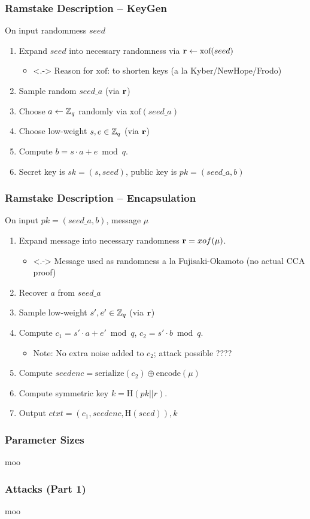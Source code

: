 \documentclass[11pt,t,xcolor=pdftex,svgnames]{beamer}
\newcommand{\xof}{\ensuremath{\text{xof}}}
\begin{document}
\begin{frame}\frametitle{Ramstake Description -- KeyGen}
\onslide<+->
On input randommess $seed$
\begin{enumerate}
\item<+-> Expand $seed$ into necessary randomness via $\vecr \gets
  \xof(seed)$
\begin{itemize}
\smallskip
\item<.-> Reason for $\text{xof}$: to
  shorten keys (a la Kyber/NewHope/Frodo)
\smallskip
\end{itemize}
\item<+-> Sample random $seed\_a$ (via $\mathbf{r}$)
\medskip
\item<+-> Choose $a \gets \mathbb{Z}_q$ randomly via $\text{xof}(seed\_a)$ 
\medskip
\item<+-> Choose \alert{low-weight} $s, e \in \mathbb{Z}_q$ (via $\mathbf{r}$)
\medskip
\item<+-> Compute $b = s\cdot a + e \bmod{q}$. 
\medskip
\item<+-> Secret key is $sk=(s, seed)$, public key is $pk=(seed\_a, b)$
\end{enumerate}
\end{frame}

\begin{frame}\frametitle{Ramstake Description -- Encapsulation}
\onslide<+->
On input $pk=(seed\_a,b)$, message $\mu$
\begin{enumerate}
\item<+-> Expand message into necessary randomness $\mathbf{r}=xof(\mu)$.
\begin{itemize}
\smallskip
\item<.-> Message used as randomness a la Fujisaki-Okamoto (no actual
  CCA proof)

\end{itemize}
\item<+-> Recover $a$ from $seed\_a$
\medskip
\item<+-> Sample \alert{low-weight} $s', e' \in \mathbb{Z}_q$ (via $\mathbf{r}$)
\medskip
\item<+-> Compute $c_1 = s'\cdot a + e' \bmod{q}$, $c_2 = s'\cdot b
  \bmod{q}$.
\begin{itemize}
\smallskip
\item<+-> \alert{Note}: No extra noise added to $c_2$; attack possible
  ????
\end{itemize} 
\medskip
\item<+-> Compute $seedenc = \text{serialize}(c_2) \oplus
  \text{encode}(\mu)$
\medskip
\item<+-> Compute symmetric key $k=\text{H}(pk || r)$.
\smallskip
\item <+-> Output $ctxt = (c_1, seedenc, \text{H}(seed)), k$
\end{enumerate}
\end{frame}

\begin{frame}\frametitle{Parameter Sizes}
moo
\end{frame}

\begin{frame}\frametitle{Attacks (Part 1)}
moo
\end{frame}
\end{document}
